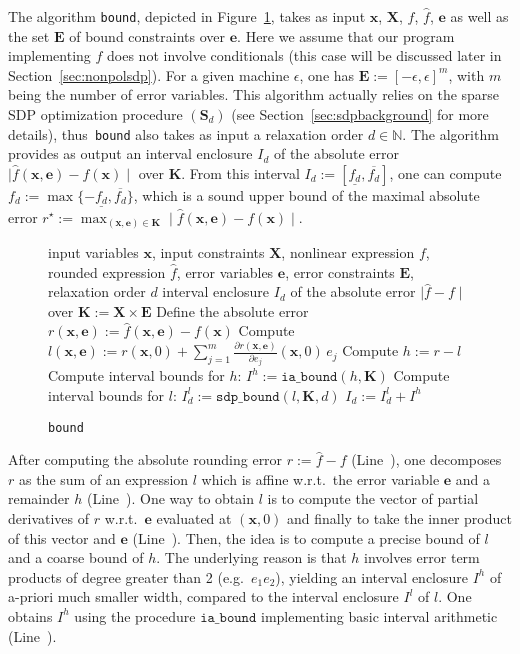 \documentclass[preprint]{sigplanconf}
\newcommand{\code}[1]{\lstinline{#1}}
\newcommand{\N}{\mathbb{N}}
\newcommand{\x}{\mathbf{x}}
\newcommand{\e}{\mathbf{e}}
\def\S{\mathbf{S}}
\def\E{\mathbf{E}}
\def\K{\mathbf{K}}
\def\S{\mathbf{S}}
\def\X{\mathbf{X}}
\newcommand{\iaboundfun}[2]{\mathtt{ia\_bound}(#1, #2)}
\newcommand{\iabound}{\mathtt{ia\_bound}}
\newcommand{\sdpboundfun}[3]{\mathtt{sdp\_bound}(#1, #2, #3)}
\theoremstyle{plain}
\begin{document}
The algorithm \code{bound}, depicted in Figure~\ref{alg:bound}, takes as input $\x$, $\X$, $f$, $\hat{f}$, $\e$ as well as the set $\E$ of bound constraints over $\e$. Here we assume that our program implementing $f$ does not involve conditionals (this case will be discussed later in Section~\ref{sec:nonpolsdp}). For a given machine $\epsilon$, one has $\E := [-\epsilon, \epsilon]^m$, with $m$ being the number of error variables. This algorithm actually relies on the sparse SDP optimization procedure $(\S_d)$ (see Section~\ref{sec:sdpbackground} for more details), thus~\code{bound} also takes as input a relaxation order $d \in \N$. The algorithm provides as output an interval enclosure $I_d$ of the absolute error $\mid \hat{f}(\x,\e) - f(\x) \mid$ over $\K$. 
From this interval $I_d:= [\underline{f_d}, \overline{f_d}]$, one can compute $f_d := \max \{- \underline{f_d}, \overline{f_d} \}$, which is a sound upper bound of the maximal absolute error $r^\star := \max_{(\x,\e)\in \K} \mid \hat{f}(\x,\e) - f(\x) \mid $.

\begin{figure}[!ht]
\begin{algorithmic}[1]                    
\Require input variables $\x$, input constraints $\X$, nonlinear expression $f$, rounded expression $\hat{f}$, error variables $\e$, error constraints $\E$, relaxation order $d$
\Ensure interval enclosure $I_d$ of the absolute error $\mid \hat{f} - f  \mid$ over $\K := \X \times \E$
\State Define the absolute error $r(\x, \e) := \hat{f}(\x,\e) - f(\x)$ \label{line:r}
\State Compute $l(\x,\e) := r(\x, 0) + \sum_{j=1}^m \frac{\partial r(\x,\e)} {\partial e_j} (\x,0) \, e_j$ \label{line:l}
\State Compute $h := r - l$ \label{line:h}
\State Compute interval bounds for $h$: $I^h := \iaboundfun{h}{\K}$ \label{line:iabound}
\State Compute interval bounds for $l$: $I_d^l := \sdpboundfun{l}{\K}{d}$  \label{line:sdpbound}
\State \Return $I_d := I_d^l + I^h$ 
\end{algorithmic}
\caption{\code{bound}}
\label{alg:bound}
\end{figure}

After computing the absolute rounding error $r := \hat{f} - f$ (Line~), one decomposes $r$ as the sum of an expression $l$ which is affine w.r.t.~the error variable $\e$ and a remainder $h$ (Line~). One way to obtain $l$ is to compute the vector of partial derivatives of $r$ w.r.t.~$\e$ evaluated at $(\x, 0)$ and finally to take the inner product of this vector and $\e$ (Line~). Then, the idea is to compute a precise bound of $l$ and a coarse bound of $h$. The underlying reason is that $h$ involves error term products of degree greater than 2 (e.g.~$e_1 e_2$), yielding an interval enclosure $I^h$ of a-priori much smaller width, compared to the interval enclosure $I^l$ of $l$. One obtains $I^h$ using the procedure $\iabound$ implementing basic interval arithmetic (Line~). 
%
\end{document}

